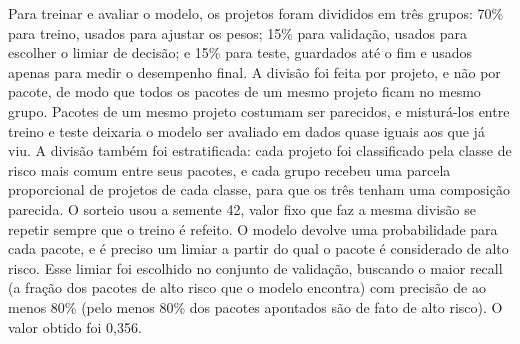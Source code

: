 \documentclass[
  a4paper,
]{article}
\begin{document}
Para treinar e avaliar o modelo, os projetos foram divididos em três grupos: 70\% para treino, usados para ajustar os pesos; 15\% para validação, usados para escolher o limiar de decisão; e 15\% para teste, guardados até o fim e usados apenas para medir o desempenho final. A divisão foi feita por projeto, e não por pacote, de modo que todos os pacotes de um mesmo projeto ficam no mesmo grupo. Pacotes de um mesmo projeto costumam ser parecidos, e misturá-los entre treino e teste deixaria o modelo ser avaliado em dados quase iguais aos que já viu. A divisão também foi estratificada: cada projeto foi classificado pela classe de risco mais comum entre seus pacotes, e cada grupo recebeu uma parcela proporcional de projetos de cada classe, para que os três tenham uma composição parecida. O sorteio usou a semente 42, valor fixo que faz a mesma divisão se repetir sempre que o treino é refeito. O modelo devolve uma probabilidade para cada pacote, e é preciso um limiar a partir do qual o pacote é considerado de alto risco. Esse limiar foi escolhido no conjunto de validação, buscando o maior recall (a fração dos pacotes de alto risco que o modelo encontra) com precisão de ao menos 80\% (pelo menos 80\% dos pacotes apontados são de fato de alto risco). O valor obtido foi 0,356.
\end{document}
